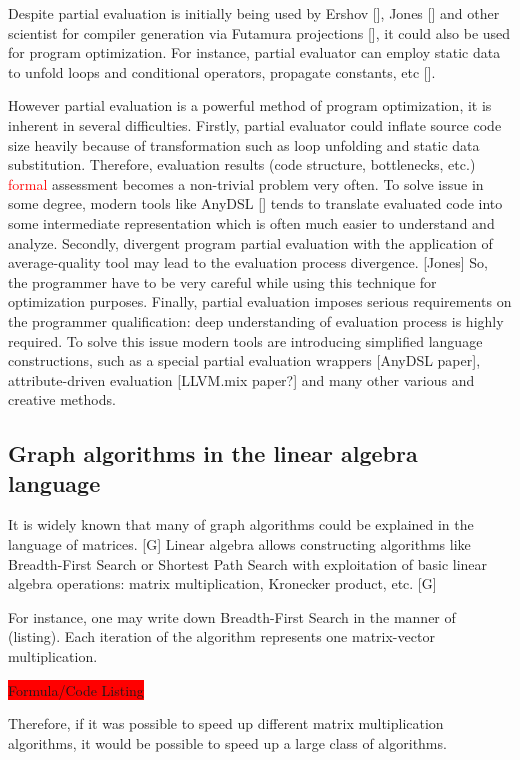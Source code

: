 \documentclass[conference]{IEEEtran}
\begin{document}
Despite partial evaluation is initially being used by Ershov [], Jones [] and other scientist for compiler generation via Futamura projections [], it could also be used for program optimization. For instance, partial evaluator can employ static data to unfold loops and conditional operators, propagate constants, etc []. 

However partial evaluation is a powerful method of program optimization, it is inherent in several difficulties. Firstly, partial evaluator could inflate source code size heavily because of transformation such as loop unfolding and static data substitution. Therefore, evaluation results (code structure, bottlenecks, etc.) \textcolor{red}{formal} assessment becomes a non-trivial problem very often. To solve issue in some degree, modern tools like AnyDSL [] tends to translate evaluated code into some intermediate representation which is often much easier to understand and analyze. Secondly, divergent program partial evaluation with the application of average-quality tool may lead to the evaluation process divergence. [Jones] So, the programmer have to be very careful while using this technique for optimization purposes. Finally, partial evaluation imposes serious requirements on the programmer qualification: deep understanding of evaluation process is highly required. To solve this issue modern tools are introducing simplified language constructions, such as a special partial evaluation wrappers [AnyDSL paper], attribute-driven evaluation [LLVM.mix paper?] and many other various and creative methods.

\subsection{Graph algorithms in the linear algebra language}

It is widely known that many of graph algorithms could be explained in the language of matrices. [G] Linear algebra allows constructing algorithms like Breadth-First Search or Shortest Path Search with exploitation of basic linear algebra operations: matrix multiplication, Kronecker product, etc. [G]

For instance, one may write down Breadth-First Search in the manner of (listing). Each iteration of the algorithm represents one matrix-vector multiplication.
\bigskip

\colorbox{red}{Formula/Code Listing}
\bigskip

Therefore, if it was possible to speed up different matrix multiplication algorithms, it would be possible to speed up a large class of algorithms. 
\end{document}
